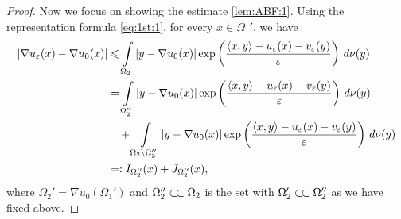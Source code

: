 \documentclass[reqno,12pt]{article}
\newcommand{\inner}[2]{\left\langle #1, #2 \right\rangle}
\newcommand{\I}{\int\limits}
\newcommand{\ssubset}{\subset\joinrel\subset}
\begin{document}
\begin{proof}
Now we focus on showing the estimate \eqref{lem:ABF:1}. Using the representation formula \eqref{eq:1st:1}, for every $x\in\Omega_{1}'$, we have 
    \begin{align}
        \label{ABF:s3:4}
        |\nabla u_{\varepsilon}(x)-\nabla u_{0}(x)| 
        &\leqslant
        \I_{\Omega_2} |y-\nabla u_{0}(x)|\exp\left(\frac{\inner{x}{y}-u_{\varepsilon}(x)-v_{\varepsilon}(y)}{\varepsilon}\right)\,d\nu(y)
        \notag\\&
        =
        \I_{\Omega_2''} |y-\nabla u_{0}(x)|\exp\left(\frac{\inner{x}{y}-u_{\varepsilon}(x)-v_{\varepsilon}(y)}{\varepsilon}\right)\,d\nu(y)
        \notag\\&
        \quad +
        \I_{\Omega_{2}\setminus \Omega_{2}''} |y-\nabla u_{0}(x)|\exp\left(\frac{\inner{x}{y}-u_{\varepsilon}(x)-v_{\varepsilon}(y)}{\varepsilon}\right)\,d\nu(y)
        \notag\\&
        =: I_{\Omega_{2}''}(x) + J_{\Omega_{2}''}(x),
    \end{align}
where $\Omega_{2}' = \nabla u_{0}(\Omega_{1}')$ and $\Omega_{2}''\ssubset \Omega_{2}$ is the set with $\Omega_{2}'\ssubset \Omega_{2}''$ as we have fixed above.


\end{proof}
\end{document}
